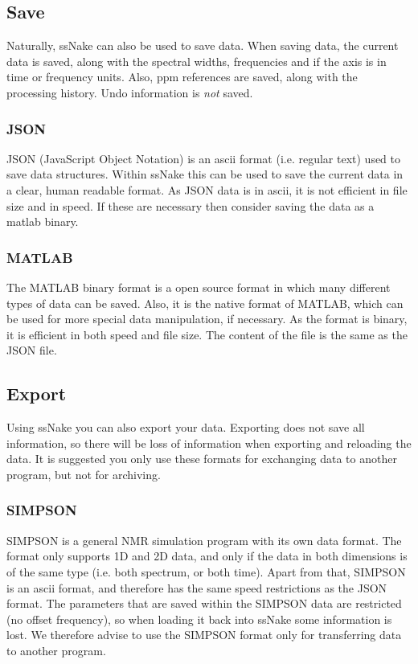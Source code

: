 \documentclass[11pt,a4paper]{article}
\begin{document}
\subsection{Save}
Naturally, ssNake can also be used to save data. When saving data, the current data is saved, along with the spectral widths, frequencies and if the axis is in time or frequency units. Also, ppm references are saved, along with the processing history. Undo information is \textit{not} saved.

\subsubsection*{JSON}
JSON (JavaScript Object Notation) is an ascii format (i.e. regular text) used to save data structures. Within ssNake this can be used to save the current data in a clear, human readable format. As JSON data is in ascii, it is not efficient in file size and in speed. If these are necessary then consider saving the data as a matlab binary.

\subsubsection*{MATLAB}
The MATLAB binary format is a open source format in which many different types of data can be saved. Also, it is the native format of MATLAB, which can be used for more special data manipulation, if necessary. As the format is binary, it is efficient in both speed and file size. The content of the file is the same as the JSON file.


\subsection{Export}
Using ssNake you can also export your data. Exporting does not save all information, so there will be loss of information when exporting and reloading the data. It is suggested you only use these formats for exchanging data to another program, but not for archiving.


\subsubsection*{SIMPSON}
SIMPSON is a general NMR simulation program with its own data format. The format only supports 1D and 2D data, and only if the data in both dimensions is of the same type (i.e. both spectrum, or both time). Apart from that, SIMPSON is an ascii format, and therefore has the same speed restrictions as the JSON format. The parameters that are saved within the SIMPSON data are restricted (no offset frequency), so when loading it back into ssNake some information is lost. We therefore advise to use the SIMPSON format only for transferring data to another program.
\end{document}

